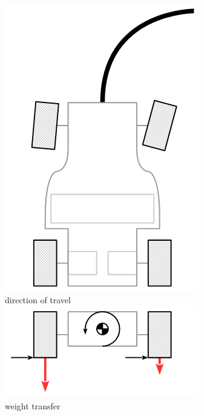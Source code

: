 \documentclass{beamer}
\begin{document}
\begin{frame}
\begin{columns}[t]
\begin{figure}
    \includegraphics[scale=0.3]{images-dis12/car-top-turning} \\
    direction of travel \\
    \vspace{\baselineskip}
     {
    \includegraphics[scale=0.3]{images-dis12/car-weighttransfer-lateral-fbd} \\
    weight transfer
    }
  \end{figure}
\end{columns}
\end{frame}
\end{document}
